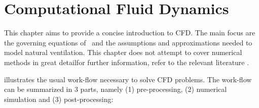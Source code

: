 
\chapter{Computational Fluid Dynamics}
\label{chap:CFD}



This chapter aims to provide a concise introduction to \gls{CFD}. 
The main focus are the governing equations of \CFD\ and the assumptions and approximations needed to model natural ventilation.
This chapter does not attempt to cover numerical methods in great detail\textemdash for further information, refer to the relevant literature \citep{Wilcox2006, Etheridge2012, Nielsen2007, Ferziger}. 

 illustrates the usual work-flow necessary to solve \gls{CFD} problems.
The work-flow can be summarized in 3 parts, namely (1) pre-processing, (2) numerical simulation and (3) post-processing:


